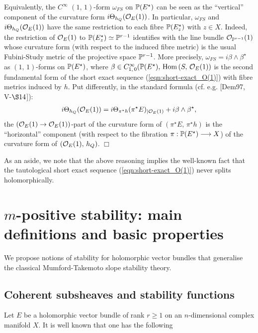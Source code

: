 \documentclass[12pt]{article}
\begin{document}
Equivalently, the $C^\infty$ $(1,\,1)$-form $\omega_{FS}$ on $\mathbb{P}(E^\star)$ can be seen as the ``vertical'' component of the curvature form $i\Theta_{h_Q}({\cal O}_E(1))$. In particular, $\omega_{FS}$ and $i\Theta_{h_Q}({\cal O}_E(1))$ have the same restriction to each fibre $\mathbb{P}(E^\star_z)$ with $z\in X$. Indeed, the restriction of ${\cal O}_E(1)$ to $\mathbb{P}(E^\star_z)\simeq\mathbb{P}^{r-1}$ identifies with the line bundle ${\cal O}_{\mathbb{P}^{r-1}}(1)$ whose curvature form (with respect to the induced fibre metric) is the usual Fubini-Study metric of the projective space $\mathbb{P}^{r-1}$. More precisely, $\omega_{FS} = i\beta\wedge\beta^\star$ as $(1,\,1)$-forms on $\mathbb{P}(E^\star)$, where $\beta\in C^\infty_{1,\,0}(\mathbb{P}(E^\star),\,\mbox{Hom}\,(S,\,{\cal O}_E(1))$ is the second fundamental form of the short exact sequence (\ref{eqn:short-exact_O(1)}) with fibre metrics induced by $h$. Put differently, in the standard formula (cf. e.g. [Dem97, V-$\S14$]): \begin{eqnarray*}i\Theta_{h_Q}({\cal O}_E(1)) = i\Theta_{\pi^\star h}(\pi^\star E)_{|{\cal O}_E(1)} + i\beta\wedge\beta^\star,\end{eqnarray*} the $({\cal O}_E(1)\to{\cal O}_E(1))$-part of the curvature form of $(\pi^\star E,\, \pi^\star h)$ is the ``horizontal'' component (with respect to the fibration $\pi:\mathbb{P}(E^\star)\longrightarrow X$) of the curvature form of $({\cal O}_E(1),\,h_Q)$. \hfill $\Box$

\vspace{2ex}

As an aside, we note that the above reasoning implies the well-known fact that the tautological short exact sequence (\ref{eqn:short-exact_O(1)}) never splits holomorphically. 


\section{$m$-positive stability: main definitions and basic properties}\label{section:m-pos-stability_def-prop_stability} We propose notions of stability for holomorphic vector bundles that generalise the classical Mumford-Takemoto slope stability theory.

\subsection{Coherent subsheaves and stability functions}\label{subsection:subsheaves_Z-functions}

 Let $E$ be a holomorphic vector bundle of rank $r\geq 1$ on an $n$-dimensional complex manifold $X$. It is well known that one has the following
\end{document}
